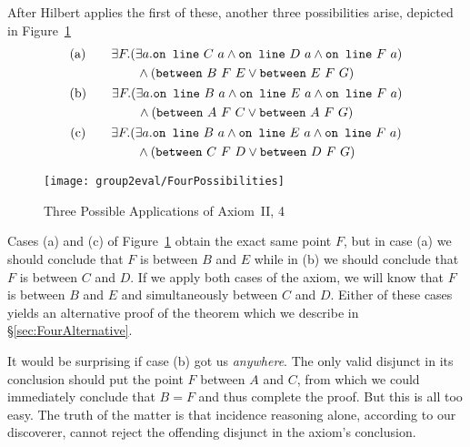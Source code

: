 After Hilbert applies the first of these, another three possibilities arise, depicted in Figure~\ref{fig:FourPossibilities}
\begin{gather*}
\begin{split}\text{(a)}\qquad
&\exists F. (\exists a. \code{on\ line}\ C\ a \wedge \code{on\ line}\ D\ a \wedge \code{on\ line}\ F\ a)\\
&\qquad \wedge (\between{B}{F}{E} \vee \between{E}{F}{G})
\end{split}\\
\begin{split}\text{(b)}\qquad
&\exists F. (\exists a. \code{on\ line}\ B\ a \wedge \code{on\ line}\ E\ a \wedge \code{on\ line}\ F\ a)\\
&\qquad \wedge (\between{A}{F}{C} \vee \between{A}{F}{G})
\end{split}\\
\begin{split}\text{(c)}\qquad
&\exists F. (\exists a. \code{on\ line}\ B\ a \wedge \code{on\ line}\ E\ a \wedge \code{on\ line}\ F\ a)\\
&\qquad \wedge (\between{C}{F}{D} \vee \between{D}{F}{G}) 
\end{split}\\
\end{gather*}

\begin{figure}
  \texttt{[image: group2eval/FourPossibilities]}
  \caption{Three Possible Applications of Axiom~II, 4}
  \label{fig:FourPossibilities}
\end{figure}

Cases (a) and (c) of Figure~\ref{fig:FourPossibilities} obtain the exact same point $F$, but in case (a) we should conclude that $F$ is between $B$ and $E$ while in (b) we should conclude that $F$ is between $C$ and $D$. If we apply both cases of the axiom, we will know that $F$ is between $B$ and $E$ and simultaneously between $C$ and $D$. Either of these cases yields an alternative proof of the theorem which we describe in \S\ref{sec:FourAlternative}.

It would be surprising if case (b) got us \emph{anywhere}. The only valid disjunct in its conclusion should put the point $F$ between $A$ and $C$, from which we could immediately conclude that $B = F$ and thus complete the proof. But this is all too easy. The truth of the matter is that incidence reasoning alone, according to our discoverer, cannot reject the offending disjunct in the axiom's conclusion.

